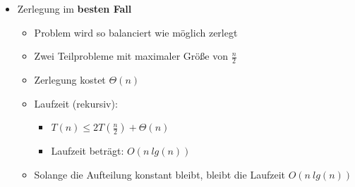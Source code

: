 \begin{itemize}
\begin{itemize}
                \item Zerlegung im \textbf{besten Fall}
                    \begin{itemize}
                        \item Problem wird so balanciert wie möglich zerlegt 
                        \item Zwei Teilprobleme mit maximaler Größe von $\frac{n}{2}$
                        \item Zerlegung kostet $\Theta(n)$
                        \item Laufzeit (rekursiv):
                            \begin{itemize}
                                \item $T(n) \leq 2T(\frac{n}{2}) + \Theta(n)$
                                \item Laufzeit beträgt: $O(n~lg(n))$
                            \end{itemize}
                        \item Solange die Aufteilung konstant bleibt, bleibt die Laufzeit $O(n~lg(n))$
                    \end{itemize}
                
            \end{itemize}
    \end{itemize}

